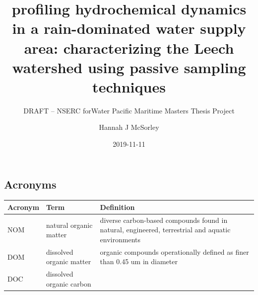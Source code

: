 \documentclass[]{article}
\title{profiling hydrochemical dynamics in a rain-dominated water supply area:
characterizing the Leech watershed using passive sampling techniques}
\subtitle{DRAFT -- NSERC forWater Pacific Maritime Masters Thesis Project}
\author{Hannah J McSorley}
\date{2019-11-11}
\begin{document}
\maketitle

\subsection{Acronyms}\label{acronyms}

\begin{longtable}[]{@{}lll@{}}
\toprule
\begin{minipage}[b]{0.11\columnwidth}\raggedright\strut
Acronym\strut
\end{minipage} & \begin{minipage}[b]{0.09\columnwidth}\raggedright\strut
Term\strut
\end{minipage} & \begin{minipage}[b]{0.16\columnwidth}\raggedright\strut
Definition\strut
\end{minipage}\tabularnewline
\midrule
\endhead
\begin{minipage}[t]{0.11\columnwidth}\raggedright\strut
NOM\strut
\end{minipage} & \begin{minipage}[t]{0.09\columnwidth}\raggedright\strut
natural organic matter\strut
\end{minipage} & \begin{minipage}[t]{0.16\columnwidth}\raggedright\strut
diverse carbon-based compounds found in natural, engineered, terrestrial
and aquatic environments\strut
\end{minipage}\tabularnewline
\begin{minipage}[t]{0.11\columnwidth}\raggedright\strut
DOM\strut
\end{minipage} & \begin{minipage}[t]{0.09\columnwidth}\raggedright\strut
dissolved organic matter\strut
\end{minipage} & \begin{minipage}[t]{0.16\columnwidth}\raggedright\strut
organic compounds operationally defined as finer than 0.45 um in
diameter\strut
\end{minipage}\tabularnewline
\begin{minipage}[t]{0.11\columnwidth}\raggedright\strut
DOC\strut
\end{minipage} & \begin{minipage}[t]{0.09\columnwidth}\raggedright\strut
dissolved organic carbon\strut
\end{minipage} & \begin{minipage}[t]{0.16\columnwidth}\raggedright\strut

\end{minipage}
\end{longtable}
\end{document}
